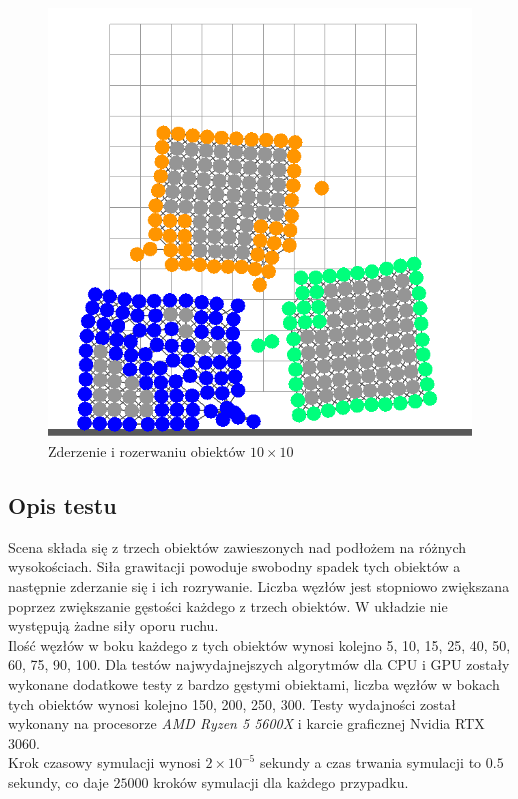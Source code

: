 \documentclass[12pt, letterpaper]{report}
\begin{document}
\begin{figure}
        \includegraphics[width=0.9\linewidth]{app_boundary_performance_10x10_02.png} 
        \caption{Zderzenie i rozerwaniu obiektów $10\times10$}
    \end{figure}
    \subsection{Opis testu}
    Scena składa się z trzech obiektów zawieszonych nad podłożem na różnych wysokościach. Siła grawitacji 
    powoduje swobodny spadek tych obiektów a następnie zderzanie się i ich rozrywanie. Liczba węzłów jest
    stopniowo zwiększana poprzez zwiększanie gęstości każdego z trzech obiektów. W układzie nie
    występują żadne siły oporu ruchu.\\
    
    Ilość węzłów w boku 
    każdego z tych obiektów wynosi kolejno 5, 10, 15, 25, 40, 50, 60, 75, 90, 100. Dla 
    testów najwydajnejszych algorytmów dla CPU i GPU zostały wykonane dodatkowe testy z 
    bardzo gęstymi obiektami, liczba węzłów w bokach tych obiektów wynosi kolejno 150, 200, 250, 300.
    Testy wydajności został wykonany na procesorze \emph{AMD Ryzen 5 5600X} i
    karcie graficznej Nvidia RTX 3060. \\
    
    Krok czasowy symulacji wynosi
    $2 \times 10^{-5}$ sekundy a czas trwania symulacji to $0.5$ sekundy, co 
    daje $25000$ kroków symulacji dla każdego przypadku. \\
\end{document}

